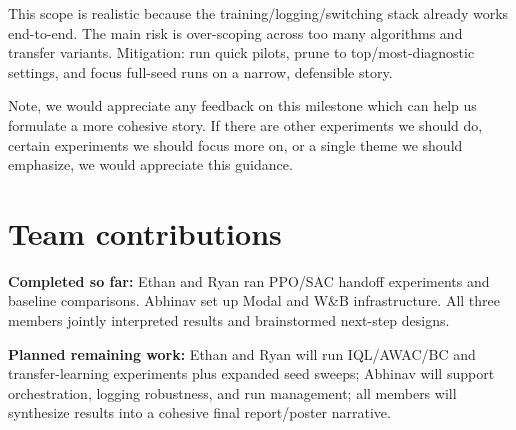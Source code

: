 \documentclass[10pt]{article}
\begin{document}
This scope is realistic because the training/logging/switching stack already works end-to-end. The main risk is over-scoping across too many algorithms and transfer variants. Mitigation: run quick pilots, prune to top/most-diagnostic settings, and focus full-seed runs on a narrow, defensible story.

Note, we would appreciate any feedback on this milestone which can help us formulate a more cohesive story. If there are other experiments we should do, certain experiments we should focus more on, or a single theme we should emphasize, we would appreciate this guidance.

\section*{Team contributions}
\textbf{Completed so far:} Ethan and Ryan ran PPO/SAC handoff experiments and baseline comparisons. Abhinav set up Modal and W\&B infrastructure. All three members jointly interpreted results and brainstormed next-step designs.

\textbf{Planned remaining work:} Ethan and Ryan will run IQL/AWAC/BC and transfer-learning experiments plus expanded seed sweeps; Abhinav will support orchestration, logging robustness, and run management; all members will synthesize results into a cohesive final report/poster narrative.
\end{document}
